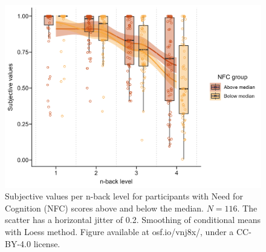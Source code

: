 \documentclass[
  man,floatsintext]{apa6}
\begin{document}
\begin{figure}[H]
\includegraphics[width=\textwidth]{Figures/nfcgroups-sv} \caption{Subjective values per n-back level for participants with Need for Cognition (NFC) scores above and below the median. $N=116$. The scatter has a horizontal jitter of 0.2. Smoothing of conditional means with Loess method. Figure available at osf.io/vnj8x/, under a CC-BY-4.0 license.}\label{fig:nfcgroups-sv}
\end{figure}
\end{document}
